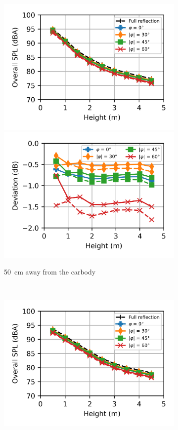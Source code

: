 \begin{figure}
\begin{subfigure}[b]{\textwidth}
		\includegraphics{fig/chap5/impedance/overall_SPL/overall_SPL_pos_f.png}
		\includegraphics{fig/chap5/impedance/overall_SPL/deviation_pos_f.png}
		\caption{\SI{50}{\centi\meter} away from the carbody}
	\end{subfigure}
	\\
	\begin{subfigure}[b]{\textwidth}
		\centering
		\includegraphics{fig/chap5/impedance/overall_SPL/overall_SPL_pos_g.png}

\end{subfigure}
\end{figure}
